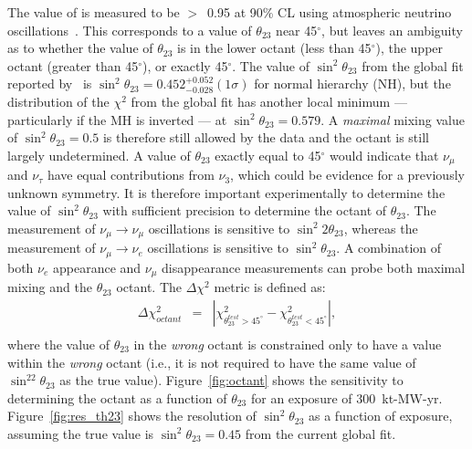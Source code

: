 The value of  is measured to be $>$~0.95 at 90\% CL 
using atmospheric neutrino oscillations~\cite{Abe:2011ph}. 
This corresponds to a value of 
$\theta_{23}$ near 45\mbox{$^{\circ}$}, but leaves an ambiguity
as to whether the value of $\theta_{23}$ is in the lower octant 
(less than 45\mbox{$^{\circ}$}), the upper octant (greater than 45\mbox{$^{\circ}$}),
or exactly 45\mbox{$^{\circ}$}. 
The value of $\sin^2 \theta_{23}$ from
the global fit reported by~\cite{Gonzalez-Garcia:2014bfa} is $\sin ^2 \theta_{23} = 0.452
^{+0.052} _{-0.028} (1 \sigma)$ for normal hierarchy (NH), but the distribution of the $\chi^2$ from
the global fit has another local minimum --- particularly if the MH 
is inverted --- at $\sin^2 \theta_{23} = 0.579$. A
\emph{maximal} mixing value of $\sin^2 \theta_{23} =0.5$ is therefore still allowed
by the data and the octant is still largely undetermined.
A value of $\theta_{23}$ exactly equal to 45\mbox{$^{\circ}$} would indicate that 
$\nu_{\mu}$ and $\nu_{\tau}$ have equal contributions from $\nu_3$,
which could be evidence for a previously unknown symmetry. 
It is
therefore important experimentally to determine the value of
$\sin ^2 \theta_{23}$ 
with sufficient precision to determine 
the octant of $\theta_{23}$. 
The measurement of $\nu_\mu \rightarrow \nu_\mu$ oscillations is
sensitive to $\sin ^2 2 \theta_{23}$, whereas the measurement of
$\nu_\mu \rightarrow \nu_e$ oscillations is sensitive to $\sin^2
\theta_{23}$. 
A combination of both $\nu_e$ appearance and $\nu_\mu$ disappearance
measurements can probe both maximal mixing and the $\theta_{23}$
octant.  The $\Delta\chi^2$ metric is defined as:
\begin{eqnarray}
\Delta\chi^2_{octant} & = & |\chi^2_{\theta_{23}^{test}>45^\circ} - \chi^2_{\theta_{23}^{test}<45^\circ}|, \\ \nonumber
\end{eqnarray}
where the value of $\theta_{23}$ in the \emph{wrong} octant is constrained 
only to have a value within the \emph{wrong} octant (i.e., it is not required
to have the same value of $\sin^22\theta_{23}$ as the true value).
Figure~\ref{fig:octant} shows the sensitivity to determining the octant as a function of $\theta_{23}$ for an exposure of 300~kt-MW-yr.  Figure~\ref{fig:res_th23} shows the resolution of $\sin^2\theta_{23}$ as a function of exposure, assuming the true value is $\sin^2\theta_{23} = 0.45$ from the current global fit.


